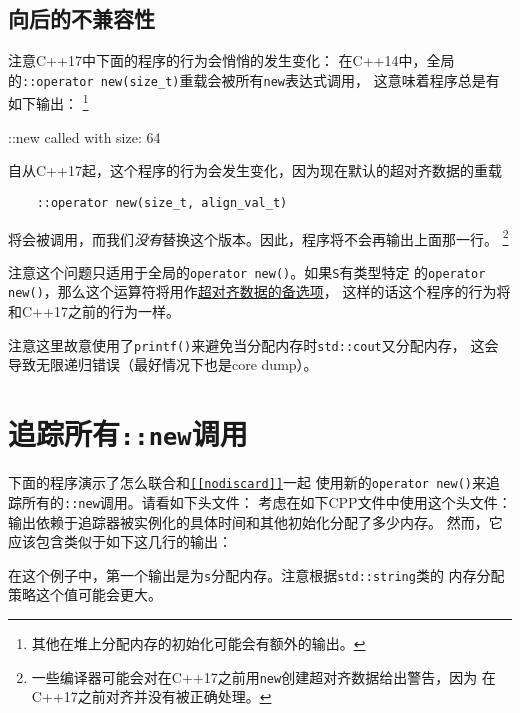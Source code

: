\subsection{向后的不兼容性}
注意C++17中下面的程序的行为会悄悄的发生变化：
在C++14中，全局的\texttt{::operator new(size\_t)}重载会被所有\texttt{new}表达式调用，
这意味着程序总是有如下输出：
\footnote{其他在堆上分配内存的初始化可能会有额外的输出。}
\begin{blacklisting}
    ::new called with size: 64
\end{blacklisting}
自从C++17起，这个程序的行为会发生变化，因为现在默认的超对齐数据的重载
\begin{lstlisting}
    ::operator new(size_t, align_val_t)
\end{lstlisting}
将会被调用，而我们\emph{没有}替换这个版本。因此，程序将不会再输出上面那一行。
\footnote{一些编译器可能会对在C++17之前用\texttt{new}创建超对齐数据给出警告，因为
在C++17之前对齐并没有被正确处理。}

注意这个问题只适用于全局的\texttt{operator new()}。如果\texttt{S}有类型特定
的\texttt{operator new()}，那么这个运算符将用作\hyperref[ch30.2.2.2]{超对齐数据的备选项}，
这样的话这个程序的行为将和C++17之前的行为一样。

注意这里故意使用了\texttt{printf()}来避免当分配内存时\texttt{std::cout}又分配内存，
这会导致无限递归错误（最好情况下也是core dump）。


\section{追踪所有\texttt{::new}调用}\label{ch30.4}
下面的程序演示了怎么联合和\hyperref[ch7.1]{\texttt{[[nodiscard]]}}一起
使用新的\texttt{operator new()}来追踪所有的\texttt{::new}调用。请看如下头文件：
考虑在如下CPP文件中使用这个头文件：
输出依赖于追踪器被实例化的具体时间和其他初始化分配了多少内存。
然而，它应该包含类似于如下这几行的输出：
在这个例子中，第一个输出是为\texttt{s}分配内存。注意根据\texttt{std::string}类的
内存分配策略这个值可能会更大。

